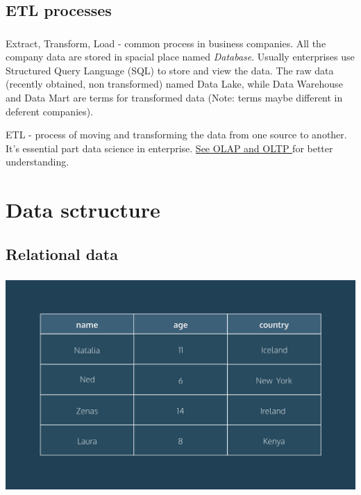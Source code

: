 \documentclass[t, 11pt]{beamer}
\begin{document}
	\subsection{ETL processes}
	
	\begin{frame} 
		\frametitle{\insertsection} 
		\framesubtitle{\insertsubsection}
	Extract, Transform, Load - common process in business companies. All the company data are stored in spacial  place named \emph{Database}. Usually enterprises use Structured Query Language (SQL) to store and view the data. The raw data (recently obtained, non transformed) named Data Lake, while Data Warehouse and Data Mart are terms for transformed data (Note: terms maybe different in deferent companies). 
	
	\vspace{1cm}
	
	ETL - process of moving and transforming the data from one source to another. It's essential part data science in enterprise. \href{https://medium.com/@yildirimabdrhm/whats-the-difference-between-oltp-and-olap-bdcafdffb1c3}{See OLAP and OLTP }for better understanding.
	\end{frame}

	 \section{Data sctructure}
	 \subsection{Relational data}
		\begin{frame} 
		\frametitle{\insertsection} 
		\framesubtitle{\insertsubsection}
	\begin{center}
		\includegraphics[scale=0.5]{rel_table}
	\end{center}
	\end{frame} 
\end{document}
